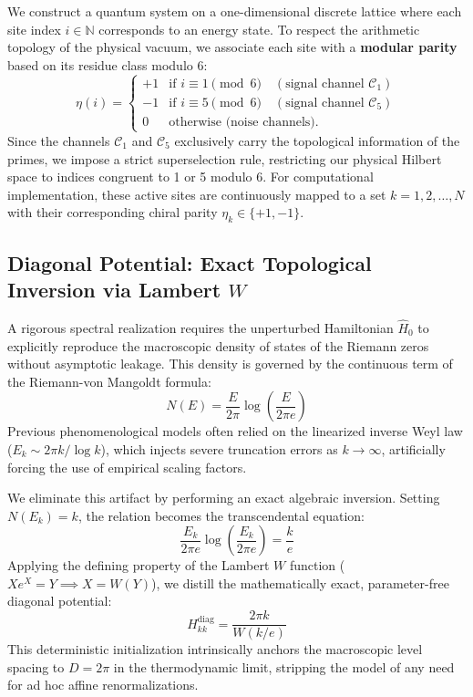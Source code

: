 \documentclass[prl,aps,floatfix,superscriptaddress,10pt]{revtex4-2}
\begin{document}
We construct a quantum system on a one-dimensional discrete lattice where each site index $i \in \mathbb{N}$ corresponds to an energy state. To respect the arithmetic topology of the physical vacuum, we associate each site with a \textbf{modular parity} based on its residue class modulo 6:
\begin{equation}
\eta(i) = \begin{cases}
+1 & \text{if } i \equiv 1 \pmod 6 \quad (\text{signal channel } \mathcal{C}_1)\\
-1 & \text{if } i \equiv 5 \pmod 6 \quad (\text{signal channel } \mathcal{C}_5)\\
0 & \text{otherwise (noise channels)}.
\end{cases}
\end{equation}
Since the channels $\mathcal{C}_1$ and $\mathcal{C}_5$ exclusively carry the topological information of the primes, we impose a strict superselection rule, restricting our physical Hilbert space to indices congruent to 1 or 5 modulo 6. For computational implementation, these active sites are continuously mapped to a set $k = 1,2,\dots,N$ with their corresponding chiral parity $\eta_k \in \{+1,-1\}$.

\subsection{Diagonal Potential: Exact Topological Inversion via Lambert $W$}

A rigorous spectral realization requires the unperturbed Hamiltonian $\hat{H}_0$ to explicitly reproduce the macroscopic density of states of the Riemann zeros without asymptotic leakage. This density is governed by the continuous term of the Riemann-von Mangoldt formula:
\begin{equation}
N(E) = \frac{E}{2\pi} \log\left(\frac{E}{2\pi e}\right)
\end{equation}
Previous phenomenological models often relied on the linearized inverse Weyl law ($E_k \sim 2\pi k / \log k$), which injects severe truncation errors as $k \to \infty$, artificially forcing the use of empirical scaling factors. 

We eliminate this artifact by performing an exact algebraic inversion. Setting $N(E_k) = k$, the relation becomes the transcendental equation:
\begin{equation}
\frac{E_k}{2\pi e} \log\left(\frac{E_k}{2\pi e}\right) = \frac{k}{e}
\end{equation}
Applying the defining property of the Lambert $W$ function ($X e^X = Y \implies X = W(Y)$), we distill the mathematically exact, parameter-free diagonal potential:
\begin{equation}
\boxed{ H_{kk}^{\text{diag}} = \frac{2\pi k}{W(k/e)} }
\end{equation}
This deterministic initialization intrinsically anchors the macroscopic level spacing to $D = 2\pi$ in the thermodynamic limit, stripping the model of any need for ad hoc affine renormalizations.
\end{document}
